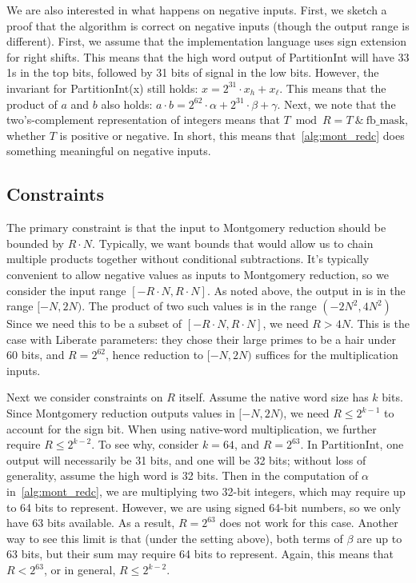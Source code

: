 \documentclass[../fheimpl.tex]{subfiles}
\begin{document}
We are also interested in what happens on negative inputs. First, we sketch a proof that the algorithm is correct on negative inputs (though the output range is different). First, we assume that the implementation language uses sign extension for right shifts. This means that the high word output of \textsf{PartitionInt} will have 33 1s in the top bits, followed by 31 bits of signal in the low bits. However, the invariant for \textsf{PartitionInt}(x) still holds: $x=2^{31}\cdot x_h + x_\ell$. This means that the product of $a$ and $b$ also holds: $a\cdot b=2^{62}\cdot \alpha+2^{31}\cdot\beta + \gamma$. 	 
Next, we note that the two's-complement representation of integers means that $T \bmod R = T\ \&\ \mathrm{fb\_mask}$, whether $T$ is positive or negative. In short, this means that~\cref{alg:mont_redc} does something meaningful on negative inputs. 

\subsection{Constraints}
The primary constraint is that the input to Montgomery reduction should be bounded by $R\cdot N$. Typically, we want bounds that would allow us to chain multiple products together without conditional subtractions. It's typically convenient to allow negative values as inputs to Montgomery reduction, so we consider the input range $[-R\cdot N, R\cdot N]$. As noted above, the output in is in the range $[-N, 2N)$. The product of two such values is in the range $(-2N^2, 4N^2)$ Since we need this to be a subset of $[-R\cdot N, R\cdot N]$, we need $R>4N$. This is the case with Liberate parameters: they chose their large primes to be a hair under 60 bits, and $R=2^{62}$, hence reduction to $[-N,2N)$ suffices for the multiplication inputs.

Next we consider constraints on $R$ itself. Assume the native word size has $k$ bits. Since Montgomery reduction outputs values in $[-N, 2N)$, we need $R\le2^{k-1}$ to account for the sign bit. When using native-word multiplication, we further require $R\le 2^{k-2}$. To see why, consider $k=64$, and $R=2^{63}$. In \textsf{PartitionInt}, one output will necessarily be 31 bits, and one will be 32 bits; without loss of generality, assume the high word is 32 bits. Then in the computation of $\alpha$ in~\cref{alg:mont_redc}, we are multiplying two 32-bit integers, which may require up to 64 bits to represent. However, we are using signed 64-bit numbers, so we only have 63 bits available. As a result, $R=2^{63}$ does not work for this case.
Another way to see this limit is that (under the setting above), both terms of $\beta$ are up to 63 bits, but their sum may require 64 bits to represent. Again, this means that $R<2^{63}$, or in general, $R\le 2^{k-2}$.
\end{document}

